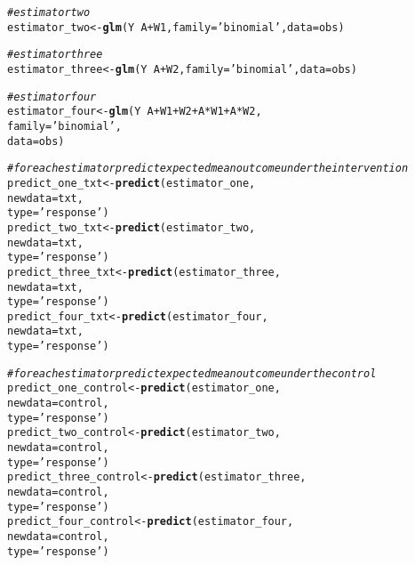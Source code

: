\documentclass{article}\usepackage[]{graphicx}\usepackage[]{xcolor}
\makeatletter
\newcommand{\hlstr}[1]{\textcolor[rgb]{0.192,0.494,0.8}{#1}}%
\newcommand{\hlcom}[1]{\textcolor[rgb]{0.678,0.584,0.686}{\textit{#1}}}%
\newcommand{\hlopt}[1]{\textcolor[rgb]{0,0,0}{#1}}%
\newcommand{\hlstd}[1]{\textcolor[rgb]{0.345,0.345,0.345}{#1}}%
\newcommand{\hlkwb}[1]{\textcolor[rgb]{0.69,0.353,0.396}{#1}}%
\newcommand{\hlkwc}[1]{\textcolor[rgb]{0.333,0.667,0.333}{#1}}%
\newcommand{\hlkwd}[1]{\textcolor[rgb]{0.737,0.353,0.396}{\textbf{#1}}}%
\newenvironment{kframe}{%
 \def\at@end@of@kframe{}%
 \ifinner\ifhmode%
  \def\at@end@of@kframe{\end{minipage}}%
  \begin{minipage}{\columnwidth}%
 \fi\fi%
 \def\FrameCommand##1{\hskip\@totalleftmargin \hskip-\fboxsep
 \colorbox{shadecolor}{##1}\hskip-\fboxsep
     \hskip-\linewidth \hskip-\@totalleftmargin \hskip\columnwidth}%
 \MakeFramed {\advance\hsize-\width
   \@totalleftmargin\z@ \linewidth\hsize
   \@setminipage}}%
 {\par\unskip\endMakeFramed%
 \at@end@of@kframe}
\newenvironment{knitrout}{}{} %
\makeatother
\begin{document}
\begin{knitrout}
\begin{kframe}
\begin{alltt}
  \hlcom{# estimator two}
  \hlstd{estimator_two} \hlkwb{<-} \hlkwd{glm}\hlstd{(Y} \hlopt{~} \hlstd{A} \hlopt{+} \hlstd{W1,} \hlkwc{family} \hlstd{=} \hlstr{'binomial'}\hlstd{,} \hlkwc{data} \hlstd{= obs)}

  \hlcom{# estimator three}
  \hlstd{estimator_three} \hlkwb{<-} \hlkwd{glm}\hlstd{(Y} \hlopt{~} \hlstd{A} \hlopt{+} \hlstd{W2,} \hlkwc{family} \hlstd{=} \hlstr{'binomial'}\hlstd{,} \hlkwc{data} \hlstd{= obs)}

  \hlcom{# estimator four}
  \hlstd{estimator_four} \hlkwb{<-} \hlkwd{glm}\hlstd{(Y} \hlopt{~} \hlstd{A} \hlopt{+} \hlstd{W1} \hlopt{+} \hlstd{W2} \hlopt{+} \hlstd{A}\hlopt{*}\hlstd{W1} \hlopt{+} \hlstd{A}\hlopt{*}\hlstd{W2,}
                        \hlkwc{family} \hlstd{=} \hlstr{'binomial'}\hlstd{,}
                        \hlkwc{data} \hlstd{= obs)}

  \hlcom{# for each estimator predict expected mean outcome under the intervention}
  \hlstd{predict_one_txt} \hlkwb{<-} \hlkwd{predict}\hlstd{(estimator_one,}
                             \hlkwc{newdata} \hlstd{= txt,}
                             \hlkwc{type} \hlstd{=} \hlstr{'response'}\hlstd{)}
  \hlstd{predict_two_txt} \hlkwb{<-} \hlkwd{predict}\hlstd{(estimator_two,}
                             \hlkwc{newdata} \hlstd{= txt,}
                             \hlkwc{type} \hlstd{=} \hlstr{'response'}\hlstd{)}
  \hlstd{predict_three_txt} \hlkwb{<-} \hlkwd{predict}\hlstd{(estimator_three,}
                               \hlkwc{newdata} \hlstd{= txt,}
                               \hlkwc{type} \hlstd{=} \hlstr{'response'}\hlstd{)}
  \hlstd{predict_four_txt} \hlkwb{<-} \hlkwd{predict}\hlstd{(estimator_four,}
                              \hlkwc{newdata} \hlstd{= txt,}
                              \hlkwc{type} \hlstd{=} \hlstr{'response'}\hlstd{)}

  \hlcom{# for each estimator predict expected mean outcome under the control}
  \hlstd{predict_one_control} \hlkwb{<-} \hlkwd{predict}\hlstd{(estimator_one,}
                                 \hlkwc{newdata} \hlstd{= control,}
                                 \hlkwc{type} \hlstd{=} \hlstr{'response'}\hlstd{)}
  \hlstd{predict_two_control} \hlkwb{<-} \hlkwd{predict}\hlstd{(estimator_two,}
                                 \hlkwc{newdata} \hlstd{= control,}
                                 \hlkwc{type} \hlstd{=} \hlstr{'response'}\hlstd{)}
  \hlstd{predict_three_control} \hlkwb{<-} \hlkwd{predict}\hlstd{(estimator_three,}
                                   \hlkwc{newdata} \hlstd{= control,}
                                   \hlkwc{type} \hlstd{=} \hlstr{'response'}\hlstd{)}
  \hlstd{predict_four_control} \hlkwb{<-} \hlkwd{predict}\hlstd{(estimator_four,}
                                  \hlkwc{newdata} \hlstd{= control,}
                                  \hlkwc{type} \hlstd{=} \hlstr{'response'}\hlstd{)}


\end{alltt}
\end{kframe}
\end{knitrout}
\end{document}

